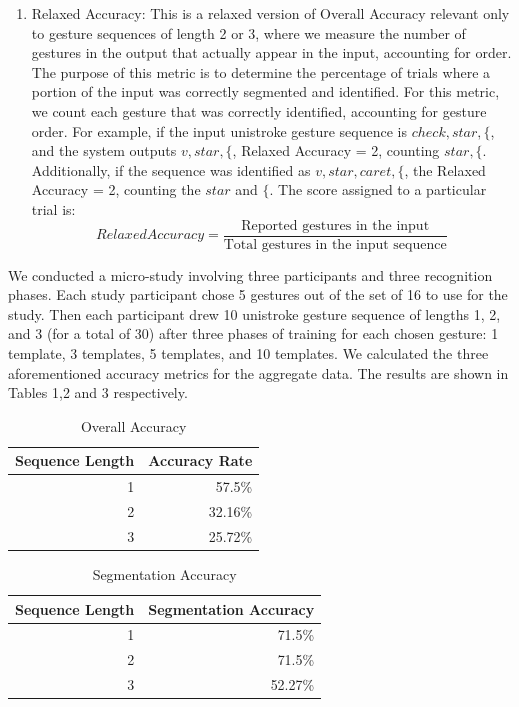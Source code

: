 \documentclass[twoside]{article}
\begin{document}
\begin{multicols}{2}
\begin{enumerate}
\item Relaxed Accuracy: This is a relaxed version of Overall Accuracy relevant
only to gesture sequences of length 2 or 3, where we measure the number of
gestures in the output that actually appear in the input, accounting for order.
The purpose of this metric is to determine the percentage of trials where a
portion of the input was correctly segmented and identified.
For this metric, we count each gesture that was correctly identified, accounting
for gesture order. For example, if the input unistroke gesture sequence is
$check, star, \{$, and the system outputs $v, star, \{$, Relaxed Accuracy = 2, counting $star, \{$. Additionally, if
the sequence was identified as $v, star, caret, \{$, the Relaxed Accuracy = 2,
counting the $star$ and $\{$. The score assigned to a particular trial is:
\[
		Relaxed Accuracy = \frac{\text{Reported gestures in the input}}{\text{Total gestures in the input sequence}}
	\]
\end{enumerate}

We conducted a micro-study involving three participants and three recognition
phases. Each study participant chose 5 gestures out of the set of 16 to use for
the study. Then each participant drew 10 unistroke gesture sequence of lengths
1, 2, and 3 (for a total of 30) after three phases of training for each chosen gesture: 1 template, 3
templates, 5 templates, and 10 templates. We calculated the three aforementioned accuracy metrics for
the aggregate data. The results are shown in Tables 1,2 and 3 respectively.

\begin{table}[H]
  \centering
  \caption{Overall Accuracy}
    \begin{tabular}{rr}
    \toprule
    Sequence Length & Accuracy Rate \\
    \midrule
    1     & 57.5\% \\
    2     & 32.16\% \\
    3     & 25.72\% \\
    \bottomrule
    \end{tabular}%
  \label{tab:addlabel}%
\end{table}%

\begin{table}[H]
  \centering
  \caption{Segmentation Accuracy}
    \begin{tabular}{rr}
    \toprule
	Sequence Length & Segmentation Accuracy \\
    \midrule
    1     & 71.5\% \\
    2     & 71.5\% \\
    3     & 52.27\% \\
    \bottomrule
    \end{tabular}%
  \label{tab:addlabel}%
\end{table}%


\end{multicols}
\end{document}
